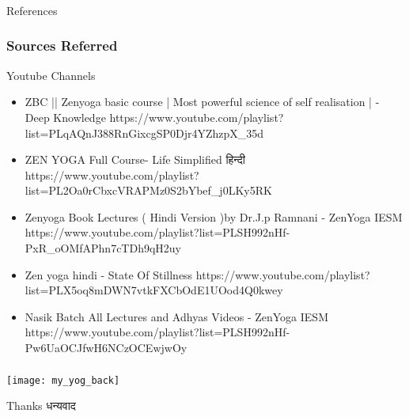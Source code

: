 \begin{frame}[fragile]\frametitle{}
\begin{center}
{\Large References}
\end{center}
\end{frame}


\begin{frame}[fragile]\frametitle{Sources Referred}

Youtube Channels

	\begin{itemize}
	\item ZBC || Zenyoga basic course | Most powerful science of self realisation | - Deep Knowledge https://www.youtube.com/playlist?list=PLqAQnJ388RnGixcgSP0Djr4YZhzpX\_35d
	\item ZEN YOGA Full Course-  Life Simplified हिन्दी https://www.youtube.com/playlist?list=PL2Oa0rCbxcVRAPMz0S2bYbef\_j0LKy5RK
	\item Zenyoga Book Lectures ( Hindi Version )by Dr.J.p Ramnani -  ZenYoga IESM https://www.youtube.com/playlist?list=PLSH992nHf-PxR\_oOMfAPhn7cTDh9qH2uy
	\item Zen yoga hindi - State Of Stillness https://www.youtube.com/playlist?list=PLX5oq8mDWN7vtkFXCbOdE1UOod4Q0kwey
	\item Nasik Batch All Lectures and Adhyas Videos - ZenYoga IESM https://www.youtube.com/playlist?list=PLSH992nHf-Pw6UaOCJfwH6NCzOCEwjwOy
	\end{itemize}

\end{frame}

\begin{frame}[fragile]\frametitle{}

\begin{center}
\texttt{[image: my\_yog\_back]}

Thanks धन्यवाद
\end{center}

\end{frame}
